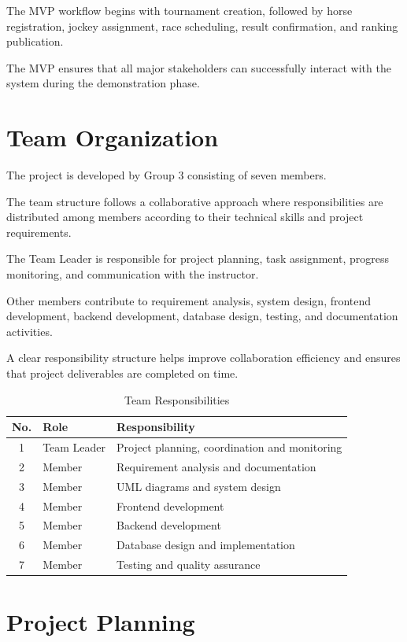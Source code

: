 The MVP workflow begins with tournament creation, followed by horse registration, jockey assignment, race scheduling, result confirmation, and ranking publication.

The MVP ensures that all major stakeholders can successfully interact with the system during the demonstration phase.

\section{Team Organization}

The project is developed by Group 3 consisting of seven members.

The team structure follows a collaborative approach where responsibilities are distributed among members according to their technical skills and project requirements.

The Team Leader is responsible for project planning, task assignment, progress monitoring, and communication with the instructor.

Other members contribute to requirement analysis, system design, frontend development, backend development, database design, testing, and documentation activities.

A clear responsibility structure helps improve collaboration efficiency and ensures that project deliverables are completed on time.

\begin{table}[H]
	\centering
	\caption{Team Responsibilities}
	\begin{tabular}{|c|p{4cm}|p{7cm}|}
		\hline
		\textbf{No.} & \textbf{Role} & \textbf{Responsibility} \\
		\hline
		1 & Team Leader & Project planning, coordination and monitoring \\
		\hline
		2 & Member & Requirement analysis and documentation \\
		\hline
		3 & Member & UML diagrams and system design \\
		\hline
		4 & Member & Frontend development \\
		\hline
		5 & Member & Backend development \\
		\hline
		6 & Member & Database design and implementation \\
		\hline
		7 & Member & Testing and quality assurance \\
		\hline
	\end{tabular}
\end{table}

\section{Project Planning}

